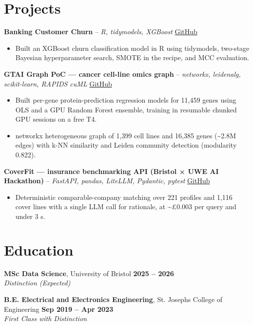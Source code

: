 \documentclass[a4paper,11pt]{article}
\begin{document}
\section{Projects}
\noindent\textbf{Banking Customer Churn} -- \textit{R, tidymodels, XGBoost} \hfill \href{https://github.com/Thiruvel-AP/Banking-Customer-Churn-Prediction}{GitHub}
\begin{itemize}
  \item Built an XGBoost churn classification model in R using tidymodels, two-stage Bayesian hyperparameter search, SMOTE in the recipe, and MCC evaluation.
\end{itemize}
\vspace{3pt}
\noindent\textbf{GTAI Graph PoC — cancer cell-line omics graph} -- \textit{networkx, leidenalg, scikit-learn, RAPIDS cuML} \hfill \href{https://github.com/Thiruvel-AP/GTAI-GraphPOC}{GitHub}
\begin{itemize}
  \item Built per-gene protein-prediction regression models for 11,459 genes using OLS and a GPU Random Forest ensemble, training in resumable chunked GPU sessions on a free T4.
  \item networkx heterogeneous graph of 1,399 cell lines and 16,385 genes (\textasciitilde{}2.8M edges) with k-NN similarity and Leiden community detection (modularity 0.822).
\end{itemize}
\vspace{3pt}
\noindent\textbf{CoverFit — insurance benchmarking API (Bristol × UWE AI Hackathon)} -- \textit{FastAPI, pandas, LiteLLM, Pydantic, pytest} \hfill \href{https://github.com/Thiruvel-AP/AIHackathon-Phoenix}{GitHub}
\begin{itemize}
  \item Deterministic comparable-company matching over 221 profiles and 1,116 cover lines with a single LLM call for rationale, at \textasciitilde{}£0.003 per query and under 3 s.
\end{itemize}

\section{Education}
\textbf{MSc Data Science}, University of Bristol \hfill \textbf{2025 – 2026}\\ \textit{Distinction (Expected)}\par
\vspace{3pt}
\textbf{B.E. Electrical and Electronics Engineering}, St. Joseph\textquotesingle{}s College of Engineering \hfill \textbf{Sep 2019 – Apr 2023}\\ \textit{First Class with Distinction}\par
\end{document}
